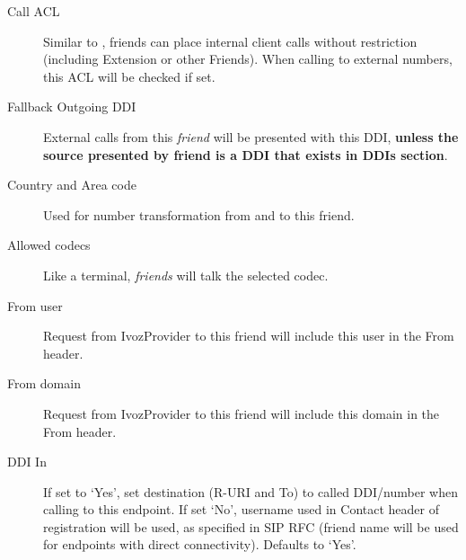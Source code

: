 \documentclass[letterpaper,10pt,spanish]{sphinxmanual}
\begin{document}
\begin{description}
\item[{Call ACL}] \leavevmode{}\label{administration_portal/client/vpbx/routing_endpoints/friends/remote_friends:term-call-acl}
Similar to {\hyperref[administration_portal/client/vpbx/users:users]{}}, friends can place internal
client calls without restriction (including Extension or other Friends).
When calling to external numbers, this ACL will be checked if set.

\item[{Fallback Outgoing DDI}] \leavevmode{}\label{administration_portal/client/vpbx/routing_endpoints/friends/remote_friends:term-fallback-outgoing-ddi}
External calls from this \emph{friend} will be presented with this DDI, \textbf{unless
the source presented by friend is a DDI that exists in DDIs section}.

\item[{Country and Area code}] \leavevmode{}\label{administration_portal/client/vpbx/routing_endpoints/friends/remote_friends:term-country-and-area-code}
Used for number transformation from and to this friend.

\item[{Allowed codecs}] \leavevmode{}\label{administration_portal/client/vpbx/routing_endpoints/friends/remote_friends:term-allowed-codecs}
Like a terminal, \emph{friends} will talk the selected codec.

\item[{From user}] \leavevmode{}\label{administration_portal/client/vpbx/routing_endpoints/friends/remote_friends:term-from-user}
Request from IvozProvider to this friend will include this user in
the From header.

\item[{From domain}] \leavevmode{}\label{administration_portal/client/vpbx/routing_endpoints/friends/remote_friends:term-from-domain}
Request from IvozProvider to this friend will include this domain in
the From header.

\item[{DDI In}] \leavevmode{}\label{administration_portal/client/vpbx/routing_endpoints/friends/remote_friends:term-ddi-in}
If set to `Yes', set destination (R-URI and To) to called DDI/number when calling to this endpoint. If set `No', username
used in Contact header of registration will be used, as specified in SIP RFC (friend name will be used for
endpoints with direct connectivity). Defaults to `Yes'.


\end{description}
\end{document}
